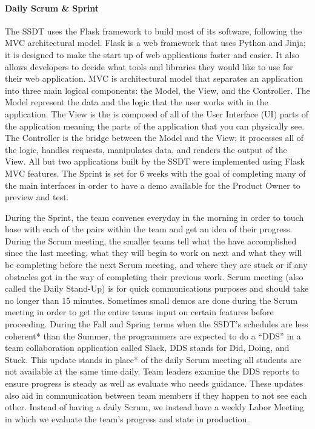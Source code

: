 \paragraph{ Daily Scrum \& Sprint} %
The SSDT uses the Flask framework to build most of its software, following the MVC architectural model. Flask is a web framework that uses Python and Jinja; it is designed to make the start up of web applications faster and easier. It also allows developers to decide what tools and libraries they would like to use for their web application. MVC is architectural model that separates an application into three main logical components: the Model, the View, and the Controller. The Model represent the data and the logic that the user works with in the application. The View is the is composed of all of the User Interface (UI) parts of the application meaning the parts of the application that you can physically see. The Controller is the bridge between the Model and the View; it processes all of the logic, handles requests, manipulates data, and renders the output of the View. All but two applications built by the SSDT were implemented using Flask MVC features. The Sprint is set for 6 weeks with the goal of completing many of the main interfaces in order to have a demo available for  the Product Owner to preview and test.

During the Sprint, the team convenes everyday in the morning in order to touch base with each of the pairs within the team and get an idea of their progress. During the Scrum meeting, the smaller teams tell what the have accomplished since the last meeting, what they will begin to work on next and what they will be completing before the next Scrum meeting, and where they are stuck or if any obstacles got in the way of completing their previous work. Scrum meeting (also called the Daily Stand-Up) is for quick communications purposes and should take no longer than 15 minutes. Sometimes small demos are done during the Scrum meeting in order to get the entire teams input on certain features before proceeding. During the Fall and Spring terms when the SSDT's schedules are less coherent* than the Summer, the programmers are expected to do a ``DDS'' in a team collaboration application called Slack, DDS stands for Did, Doing, and Stuck. This update stands in place* of the daily Scrum meeting all students are not available at the same time daily. Team leaders examine the DDS reports to ensure progress is steady as well as evaluate who needs guidance. These updates also aid in communication between team members if they happen to not see each other. Instead of having a daily Scrum, we instead have a weekly Labor Meeting in which we evaluate the team's progress and state in production.

